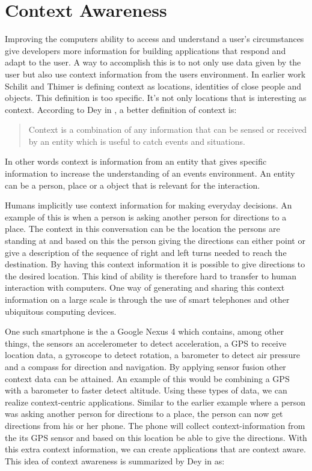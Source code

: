 \section{Context Awareness}
Improving the computers ability to access and understand a user's circumstances give developers more information for building  applications that respond and adapt to the user. A way to accomplish this is to not only use data given by the user but also use context information from the users environment. In earlier work Schilit and Thimer \cite{schilit1994disseminating} is defining context as locations, identities of close people and objects. This definition is too specific. It's not only locations that is interesting as context. According to Dey in \cite{dey2001understanding}, a better definition of context is:

\begin{quotation}
Context is a combination of any information that can be sensed or received by an entity which is useful to catch events and situations. \cite{dey2001understanding}
\end{quotation}

In other words context is information from an entity that gives specific information to increase the understanding of an events environment. An entity can be a person, place or a object that is relevant for the interaction. 

Humans implicitly use context information for making everyday decisions. An example of this is when a person is asking another person for directions to a place. The context in this conversation can be the location the persons are standing at and based on this the person giving the directions can either point or give a description of the sequence of right and left turns needed to reach the destination. By having this context information it is possible to give directions to the desired location. This kind of ability is therefore hard to transfer to human interaction with computers. One way of generating and sharing this context information on a large scale is through the use of smart telephones and other ubiquitous computing devices.

One such smartphone is the a Google Nexus 4 \cite{GoogleNexus} which contains, among other things, the sensors an accelerometer to detect acceleration, a GPS to receive location data, a gyroscope to detect rotation, a barometer to detect air pressure and a compass for direction and navigation. By applying sensor fusion \cite{Elmenreich02sensorfusion} other context data can be attained. An example of this would be combining a GPS with a barometer to faster detect altitude. Using these types of data, we can realize context-centric applications. Similar to the earlier example where a person was asking another person for directions to a place, the person can now get directions from his or her phone. The phone will collect context-information from the its GPS sensor and based on this location be able to give the directions. With this extra context information, we can create applications that are context aware. This idea of context awareness is summarized by Dey in \cite{dey2001understanding} as: 

